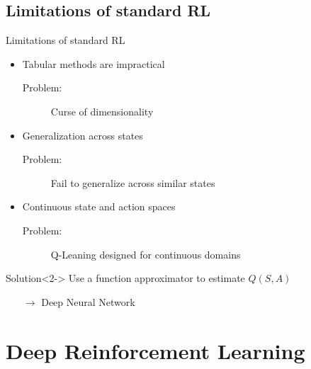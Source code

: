 \documentclass[xcolor=dvipsnames]{beamer}
\begin{document}
\subsection{Limitations of standard RL}
\begin{frame}{Limitations of standard RL}
    \begin{itemize}
        \item Tabular methods are impractical
        \begin{description}
            \item[Problem:] Curse of dimensionality
        \end{description}
        \item Generalization across states
        \begin{description}
            \item[Problem:] Fail to generalize across similar states
        \end{description}
        \item Continuous state and action spaces 
        \begin{description}
            \item[Problem:] Q-Leaning designed for continuous domains
        \end{description}
    \end{itemize}
    \begin{block}{Solution}<2->
        Use a function approximator to estimate $Q(S,A)$
        \begin{itemize}
            \item[$\boldsymbol{\rightarrow}$] Deep Neural Network
        \end{itemize}
    \end{block}
\end{frame}


\section{Deep Reinforcement Learning}
\end{document}
